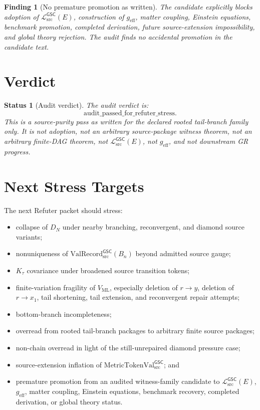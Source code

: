 \documentclass[11pt]{article}
\newcommand{\MetricTokenVal}{\mathrm{MetricTokenVal}_{\mathrm{src}}^{\mathsf{GSC}}}
\newcommand{\MetricData}{\mathcal{L}_{\mathrm{src}}^{\mathsf{GSC}}}
\newcommand{\ValRecord}{\mathrm{ValRecord}_{\mathrm{src}}^{\mathsf{GSC}}}
\newcommand{\geff}{g_{\mathrm{eff}}}
\newcommand{\Bn}{B_n}
\newtheorem{finding}{Finding}
\newtheorem{status}{Status}
\begin{document}
\begin{finding}[No premature promotion as written]
The candidate explicitly blocks adoption of \(\MetricData(E)\), construction
of \(\geff\), matter coupling, Einstein equations, benchmark promotion,
completed derivation, future source-extension impossibility, and global
theory rejection. The audit finds no accidental promotion in the candidate
text.
\end{finding}

\section{Verdict}

\begin{status}[Audit verdict]
The audit verdict is:
\[
  \mathrm{audit\_passed\_for\_refuter\_stress}.
\]
This is a source-purity pass as written for the declared rooted tail-branch
family only. It is not adoption, not an arbitrary source-package witness
theorem, not an arbitrary finite-DAG theorem, not \(\MetricData(E)\), not
\(\geff\), and not downstream GR progress.
\end{status}

\section{Next Stress Targets}

The next Refuter packet should stress:
\begin{itemize}[leftmargin=*]
  \item collapse of \(D_N\) under nearby branching, reconvergent, and diamond
  source variants;
  \item nonuniqueness of \(\ValRecord(\Bn)\) beyond admitted source gauge;
  \item \(K_{\tau}\) covariance under broadened source transition tokens;
  \item finite-variation fragility of \(V_{\mathrm{ML}}\), especially deletion
  of \(r\to y\), deletion of \(r\to x_1\), tail shortening, tail extension,
  and reconvergent repair attempts;
  \item bottom-branch incompleteness;
  \item overread from rooted tail-branch packages to arbitrary finite source
  packages;
  \item non-chain overread in light of the still-unrepaired diamond pressure
  case;
  \item source-extension inflation of \(\MetricTokenVal\); and
  \item premature promotion from an audited witness-family candidate to
  \(\MetricData(E)\), \(\geff\), matter coupling, Einstein equations,
  benchmark recovery, completed derivation, or global theory status.
\end{itemize}
\end{document}

